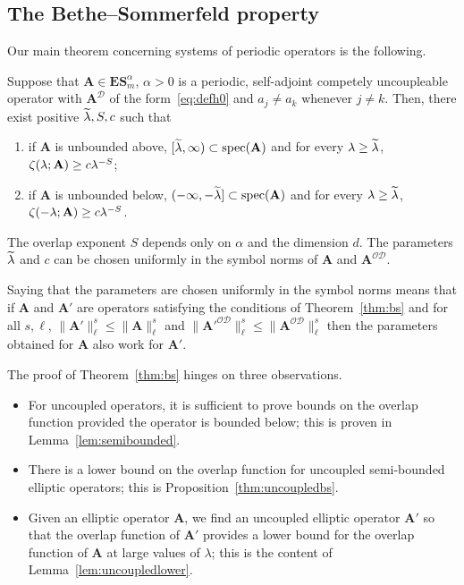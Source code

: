 \documentclass[AHL,Unicode,longabstracts,published]{cedram}
\DeclareMathOperator{\spec}{spec}
\newcommand{\CD}{\mathcal{D}}
\newcommand{\CO}{\mathcal{O}}
\newcommand{\BA}{\mathbf A}
\newcommand{\BE}{\mathbf E}
\newcommand{\BS}{\mathbf S}
\newcommand{\mpu}{competely uncoupleable}
\let\oldtilde\tilde
\renewcommand*{\tilde}[1]{\mathchoice{\widetilde{#1}}{\widetilde{#1}}{\oldtilde{#1}}{\oldtilde{#1}}}
\begin{document}
\subsection{The Bethe--Sommerfeld property} Our main theorem concerning systems of periodic operators is the following.
\begin{theo} \label{thm:bs}
Suppose that $\BA \in \BE\BS^\alpha_m$, $\alpha > 0$ is a periodic, self-adjoint
\mpu{} operator with $\BA^\CD$ of the form~\eqref{eq:defh0} and $a_j \ne a_k$ whenever $j \ne k$. Then, there exist positive $\tilde \lambda, S,c$ such that
\begin{enumerate}
\item \label{it:bspos}
if $\BA$ is unbounded above, $[\tilde \lambda,\infty) \subset
\spec(\BA)$ and for every $\lambda \ge \tilde \lambda$, $\zeta(\lambda;\BA)\linebreak \ge c
\lambda^{-S}$;
\item \label{it:bsneg}
if $\BA$ is unbounded below, $(- \infty,-\tilde \lambda] \subset
\spec(\BA)$ and for every $\lambda \ge \tilde \lambda$, $\zeta(-\lambda;\BA) \linebreak\ge c
\lambda^{-S}$.
\end{enumerate}
The overlap exponent $S$ depends only on $\alpha$ and the dimension $d$. The parameters $\tilde \lambda$ and $c$ can be chosen uniformly in the symbol norms of $\BA$ and $\BA^{\CO\CD}$.
\end{theo}

\begin{rema}
Saying that the parameters are chosen uniformly in the symbol norms means that if $\BA$ and $\BA'$ are operators satisfying the conditions of Theorem~\ref{thm:bs} and for all $s,\ell$, $\|\BA'\|^{s}_{\ell} \le \|\BA\|^{s}_{\ell}$ and $\|\BA'^{\CO\CD}\|^{s}_{\ell} \le \|\BA^{\CO\CD}\|^{s}_{\ell}$ then the parameters obtained for $\BA$ also work for $\BA'$.
\end{rema}


The proof of Theorem~\ref{thm:bs} hinges on three observations.
\begin{itemize}
\item For uncoupled operators, it is sufficient to prove bounds on the overlap function provided the operator is bounded below; this is proven in Lemma~\ref{lem:semibounded}.
\item There is a lower bound on the overlap function for uncoupled semi-bounded elliptic operators; this is Proposition~\ref{thm:uncoupledbs}.
\item Given an elliptic operator $\BA$, we find an uncoupled elliptic operator $\BA'$ so that the overlap function of $\BA'$ provides a lower bound for the overlap function of $\BA$ at large values of $\lambda$; this is the content of Lemma~\ref{lem:uncoupledlower}.
\end{itemize}
\end{document}

